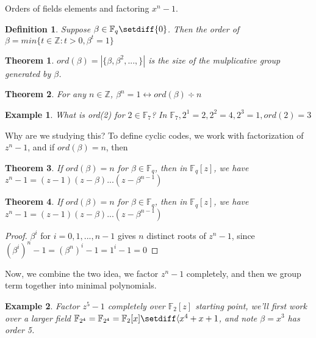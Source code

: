 \documentclass{article}
\newtheorem{thm}{Theorem}
\newtheorem{defn}{Definition}
\newtheorem{eg}{Example}
\begin{document}
Orders of fields elements and factoring $x^n-1$.
\begin{defn}
    Suppose $\beta\in\mathbb{F}_q\setdiff\{0\}$. Then the order of
    $\beta = min\{t\in\mathbb{Z}: t>0, \beta^t = 1\}$
\end{defn}

\begin{thm}
    $ord(\beta) = |\{\beta, \beta^2, ...,\}|$ is the size of the mulplicative group
    generated by $\beta$.
\end{thm}

\begin{thm}
    For any $n\in\mathbb{Z}$, $\beta^n = 1 \leftrightarrow ord(\beta)\div n$
\end{thm}

\begin{eg}
    What is ord(2) for $2\in\mathbb{F}_7$? In $\mathbb{F}_7,
    2^1 = 2, 2^2 = 4, 2^3 = 1, ord(2) = 3$
\end{eg}

Why are we studying this? To define cyclic codes, we work with factorization of
$z^n-1$, and if $ord(\beta)=n$, then
\begin{thm}
    If $ord(\beta)=n$ for $\beta\in\mathbb{F}_q$, then
    in $\mathbb{F}_q[z]$, we have $z^n-1 = (z-1)(z-\beta)...(z-\beta^{n-1})$
\end{thm}


\begin{thm}
    If $ord(\beta) = n$ for $\beta\in\mathbb{F}_q$, then in $\mathbb{F}_q[z]$, we
    have $z^n-1=(z-1)(z-\beta)...(z-\beta^{n-1})$
\end{thm}

\begin{proof}
    $\beta^i$ for $i = 0, 1, ..., n-1$ gives $n$ distinct roots of $z^n-1$, since
    $(\beta^i)^n -1 = (\beta^n)^i -1 = 1^i - 1 = 0$
\end{proof}

Now, we combine the two idea, we factor $z^n-1$ completely, and then we group
term together into minimal polynomials.

\begin{eg}
    Factor $z^5-1$ completely over $\mathbb{F}_2[z]$ starting point, we'll first
    work over a larger field $\mathbb{F}_{2^4} = \mathbb{F}_{2^4} = \mathbb{F}_2[x]
    \setdiff \langle x^4 + x +1$, and note $\beta = x^3$ has order 5.
\end{eg}
\end{document}
